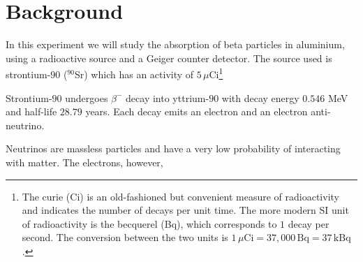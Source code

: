 \section{Background}%

In this experiment we will study the absorption of beta particles in aluminium, using a radioactive source and a Geiger counter detector. The source used is strontium-$90$ ($^{90}$Sr) which has an activity of $5\,\mu$Ci\footnote{The curie (Ci) is an old-fashioned but convenient measure of radioactivity and indicates the number of decays per unit time. The more modern SI unit of radioactivity is the becquerel (Bq), which corresponds to $1$ decay per second. The conversion between the two units is $1\,\mu\textrm{Ci} = 37,000\,\textrm{Bq} = 37\,\textrm{kBq}$.}

Strontium-$90$ undergoes $\beta^{-}$ decay into yttrium-$90$ with decay energy $0.546$ MeV and half-life $28.79$ years. Each decay emits an electron %
and an electron anti-neutrino.%

Neutrinos are massless particles and have a very low probability of interacting with matter. The electrons, however, 

